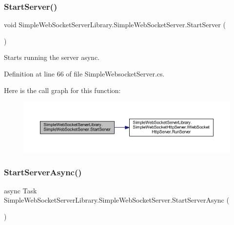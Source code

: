 \subsubsection{\texorpdfstring{Start\+Server()}{StartServer()}}
{\footnotesize\ttfamily void Simple\+Web\+Socket\+Server\+Library.\+Simple\+Web\+Socket\+Server.\+Start\+Server (\begin{DoxyParamCaption}{ }\end{DoxyParamCaption})}



Starts running the server async. 



Definition at line 66 of file Simple\+Websocket\+Server.\+cs.

Here is the call graph for this function\+:
\nopagebreak
\begin{figure}[H]
\begin{center}
\leavevmode
\includegraphics[width=350pt]{class_simple_web_socket_server_library_1_1_simple_web_socket_server_ad354c38a3f5583fe213ab913085c320a_cgraph}
\end{center}
\end{figure}
\mbox{\label{class_simple_web_socket_server_library_1_1_simple_web_socket_server_a14730d592f2fdd3278a8df1403ebd672}} 
\subsubsection{\texorpdfstring{Start\+Server\+Async()}{StartServerAsync()}}
{\footnotesize\ttfamily async Task Simple\+Web\+Socket\+Server\+Library.\+Simple\+Web\+Socket\+Server.\+Start\+Server\+Async (\begin{DoxyParamCaption}{ }\end{DoxyParamCaption})}



